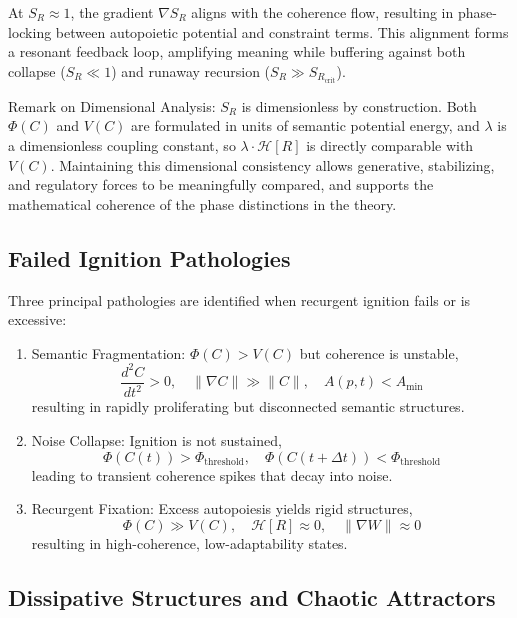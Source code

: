 At \(S_R \approx 1\), the gradient \(\nabla S_R\) aligns with the coherence flow, resulting in phase-locking between autopoietic potential and constraint terms. This alignment forms a resonant feedback loop, amplifying meaning while buffering against both collapse (\(S_R \ll 1\)) and runaway recursion (\(S_R \gg S_{R_{\text{crit}}}\)).

Remark on Dimensional Analysis: \(S_R\) is dimensionless by construction. Both \(\Phi(C)\) and \(V(C)\) are formulated in units of semantic potential energy, and \(\lambda\) is a dimensionless coupling constant, so \(\lambda \cdot \mathcal{H}[R]\) is directly comparable with \(V(C)\). Maintaining this dimensional consistency allows generative, stabilizing, and regulatory forces to be meaningfully compared, and supports the mathematical coherence of the phase distinctions in the theory.

\subsection{Failed Ignition Pathologies}

Three principal pathologies are identified when recurgent ignition fails or is excessive:

\begin{enumerate}
    \item Semantic Fragmentation: \(\Phi(C) > V(C)\) but coherence is unstable,
    \begin{equation}
    \frac{d^2C}{dt^2} > 0, \quad \|\nabla C\| \gg \|C\|, \quad A(p,t) < A_{\text{min}}
    \end{equation}
    resulting in rapidly proliferating but disconnected semantic structures.
    \item Noise Collapse: Ignition is not sustained,
    \begin{equation}
    \Phi(C(t)) > \Phi_{\text{threshold}}, \quad \Phi(C(t+\Delta t)) < \Phi_{\text{threshold}}
    \end{equation}
    leading to transient coherence spikes that decay into noise.
    \item Recurgent Fixation: Excess autopoiesis yields rigid structures,
    \begin{equation}
    \Phi(C) \gg V(C), \quad \mathcal{H}[R] \approx 0, \quad \|\nabla W\| \approx 0
    \end{equation}
    resulting in high-coherence, low-adaptability states.
\end{enumerate}

\subsection{Dissipative Structures and Chaotic Attractors}

